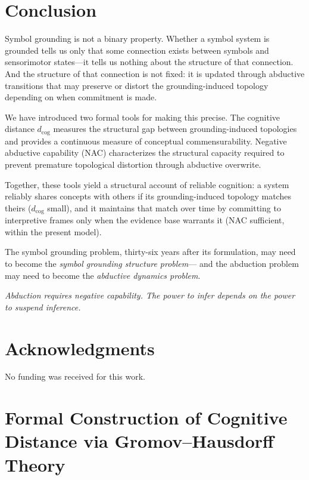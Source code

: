 \documentclass[12pt]{article}
\begin{document}
\section{Conclusion}

Symbol grounding is not a binary property.
Whether a symbol system is grounded tells us only that some connection
exists between symbols and sensorimotor states---it tells us nothing
about the structure of that connection.
And the structure of that connection is not fixed: it is updated
through abductive transitions that may preserve or distort the
grounding-induced topology depending on when commitment is made.

We have introduced two formal tools for making this precise.
The cognitive distance $d_\mathrm{cog}$ measures the structural gap
between grounding-induced topologies and provides a continuous measure
of conceptual commensurability.
Negative abductive capability (NAC) characterizes the structural
capacity required to prevent premature topological distortion through
abductive overwrite.

Together, these tools yield a structural account of reliable cognition:
a system reliably shares concepts with others if its grounding-induced
topology matches theirs ($d_\mathrm{cog}$ small), and it maintains
that match over time by committing to interpretive frames only when
the evidence base warrants it (NAC sufficient, within the present
model).

The symbol grounding problem, thirty-six years after its formulation,
may need to become the \emph{symbol grounding structure problem}---
and the abduction problem may need to become the \emph{abductive
dynamics problem}.

\medskip
\noindent
\textit{Abduction requires negative capability.
The power to infer depends on the power to suspend inference.}

\section*{Acknowledgments}

No funding was received for this work.

\appendix
\section{Formal Construction of Cognitive Distance via Gromov--Hausdorff Theory}
\label{app:gh-theory}
\end{document}
